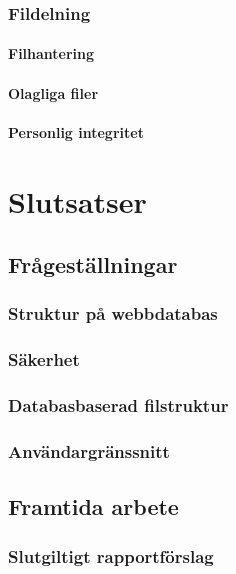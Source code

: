 \documentclass[a4paper,12pt,oneside,final]{extbook}
\begin{document}
\subsection{Fildelning}

\subsubsection{Filhantering}

\subsubsection{Olagliga filer}

\subsubsection{Personlig integritet}

\chapter{Slutsatser}

\section{Frågeställningar}

\subsection{Struktur på webbdatabas}

\subsection{Säkerhet}

\subsection{Databasbaserad filstruktur}

\subsection{Användargränssnitt}

\section{Framtida arbete}

\subsection{Slutgiltigt rapportförslag}
\end{document}
